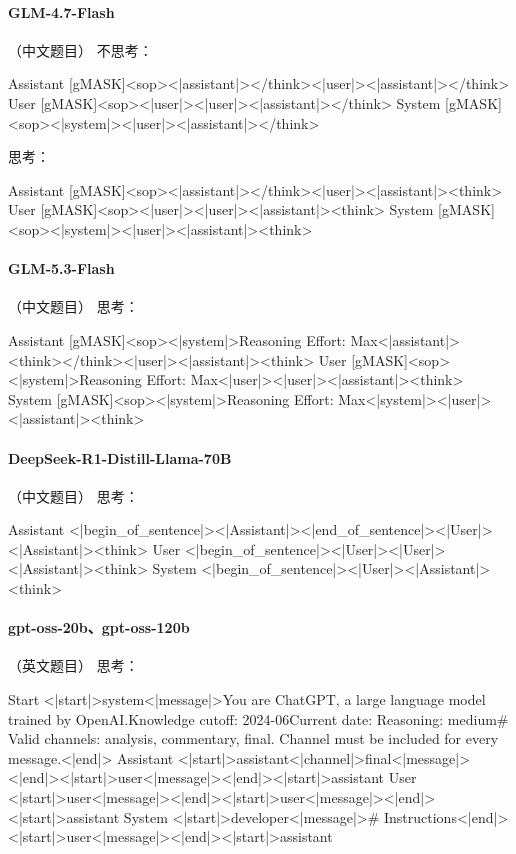 \paragraph{GLM-4.7-Flash} （中文题目）
\noindent 不思考：
\begin{Rendering}
Assistant  [gMASK]<sop><|assistant|></think><|user|><|assistant|></think>
User       [gMASK]<sop><|user|><|user|><|assistant|></think>
System     [gMASK]<sop><|system|><|user|><|assistant|></think>
\end{Rendering}
\noindent 思考：
\begin{Rendering}
Assistant  [gMASK]<sop><|assistant|></think><|user|><|assistant|><think>
User       [gMASK]<sop><|user|><|user|><|assistant|><think>
System     [gMASK]<sop><|system|><|user|><|assistant|><think>
\end{Rendering}
\paragraph{GLM-5.3-Flash} （中文题目）
\noindent 思考：
\begin{Rendering}
Assistant  [gMASK]<sop><|system|>Reasoning Effort: Max<|assistant|><think></think><|user|><|assistant|><think>
User       [gMASK]<sop><|system|>Reasoning Effort: Max<|user|><|user|><|assistant|><think>
System     [gMASK]<sop><|system|>Reasoning Effort: Max<|system|><|user|><|assistant|><think>
\end{Rendering}
\paragraph{DeepSeek-R1-Distill-Llama-70B} （中文题目）
\noindent 思考：
\begin{Rendering}
Assistant  <|begin_of_sentence|><|Assistant|><|end_of_sentence|><|User|><|Assistant|><think>\NL{}
User       <|begin_of_sentence|><|User|><|User|><|Assistant|><think>\NL{}
System     <|begin_of_sentence|><|User|><|Assistant|><think>\NL{}
\end{Rendering}
\paragraph{gpt-oss-20b、gpt-oss-120b} （英文题目）
\noindent 思考：
\begin{Rendering}
Start      <|start|>system<|message|>You are ChatGPT, a large language model trained by OpenAI.\NL{}Knowledge cutoff: 2024-06\NL{}Current date: \NL{}\NL{}Reasoning: medium\NL{}\NL{}# Valid channels: analysis, commentary, final. Channel must be included for every message.<|end|>
Assistant  <|start|>assistant<|channel|>final<|message|><|end|><|start|>user<|message|><|end|><|start|>assistant
User       <|start|>user<|message|><|end|><|start|>user<|message|><|end|><|start|>assistant
System     <|start|>developer<|message|># Instructions\NL{}\NL{}\NL{}\NL{}<|end|><|start|>user<|message|><|end|><|start|>assistant
\end{Rendering}
